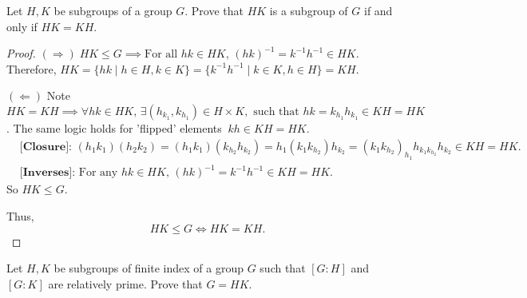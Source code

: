 \documentclass[addpoints,10pt]{exam}
\theoremstyle{plain}
\theoremstyle{definition}
\newtheorem{prob}[thm]{Problem}
\theoremstyle{plain}
\theoremstyle{plain}
\theoremstyle{definition}
\let\oldprob\prob
\let\endoldprob\endprob
\renewenvironment{prob}
  {\begin{singlespace}\oldprob}
  {\endoldprob\end{singlespace}}
\newcommand{\belowtitle}{\leavevmode\newline}
\newcommand{\Observe}{\text{Observe.}}
\newcommand{\IF}{\mathbf{(\Rightarrow)}}
\newcommand{\FI}{\mathbf{(\Leftarrow)}}
\begin{document}
\begin{prob}
  Let $H,K$ be subgroups of a group $G$. Prove that $HK$ is a subgroup of $G$ if and only if $HK=KH$.
\end{prob}

\begin{proof}\belowtitle
  $\IF\;HK\leq G\implies\text{For all }hk\in HK$, $(hk)^{-1}=k^{-1}h^{-1}\in HK$. Therefore, $HK=\{hk\mid h\in H, k\in K\}=\{k^{-1}h^{-1}\mid k\in K,h\in H\}=KH$.

  $\FI$ Note $HK=KH\implies \forall hk\in HK,\,\exists (h_{k_{1}},k_{h_{1}})\in H\times K, \text{ such that }hk=k_{h_{1}}h_{k_{1}}\in KH=HK$. The same logic holds for 'flipped' elements$\;\;kh\in KH=HK$. \Observe
  \begin{align*}
    &\textbf{[Closure]: } (h_{1}k_{1})(h_{2}k_{2})=(h_{1}k_{1})(k_{h_{2}}h_{k_{2}})=h_{1}(k_{1}k_{h_{2}})h_{k_{2}}=(k_{1}k_{h_{2}})_{h_{1}}h_{k_{1}k_{h_{2}}}h_{k_{2}}\in KH=HK.\\
    &\textbf{[Inverses]: }\text{For any }hk\in HK,\,(hk)^{-1}=k^{-1}h^{-1}\in KH=HK.
  \end{align*}
  So $HK\leq G$.

  Thus,
  $$HK\leq G\iff HK=KH.$$
\end{proof}
\newpage
\begin{prob}
  Let $H,K$ be subgroups of finite index of a group $G$ such that $[G:H]$ and $[G:K]$ are relatively prime. Prove that $G=HK$.
\end{prob}
\end{document}
